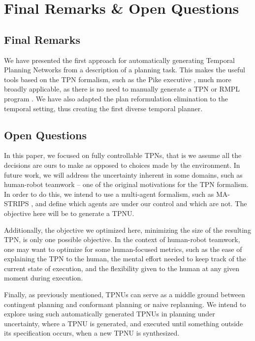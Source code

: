 \chapter{Final Remarks \& Open Questions}
\label{chap:conclusion}

\section{Final Remarks}
We have presented the first approach for automatically generating Temporal Planning 
Networks from a description of a planning task. This makes the useful tools based 
on the TPN formalism, such as the Pike executive \cite{levine2018watching}, much more
broadly applicable, as there is no need to manually generate a TPN or RMPL 
program \cite{kim2001executing}. We have also 
adapted the plan reformulation elimination \cite{katz2018novel} to the temporal
setting, thus creating the first diverse temporal planner.

\section{Open Questions}
In this paper, we focused on fully controllable TPNs, that is we assume all the
decisions are ours to make as opposed to choices made by the environment. 
In future work, we will address the uncertainty inherent in some domains, 
such as human-robot teamwork -- one of the original motivations for the TPN formalism.
In order to do this, we intend to use a multi-agent formalism, such as 
{\sc MA-STRIPS} \cite{DBLP:conf/aips/BrafmanD08}, and define which agents are 
under our control and which are not. The objective here will be to generate a TPNU.


Additionally, the objective we optimized here, minimizing the size of the resulting TPN,
is only one possible objective. In the context of human-robot teamwork, one may want
to optimize for some human-focused metrics, such as 
the ease of explaining the TPN to the human, the mental effort needed to keep track
of the current state of execution, and the flexibility given to the human at any given
moment during execution.

Finally, as previously mentioned, TPNUs can serve as a middle ground between
contingent planning and conformant planning or naive replanning. 
We intend to explore using such automatically generated TPNUs in planning under 
uncertainty, where a TPNU is generated, and executed until something outside its
specification occurs, when a new TPNU is synthesized.


